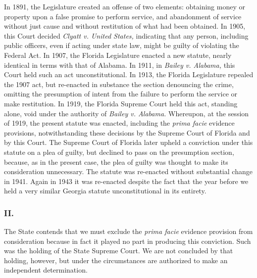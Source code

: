 \documentclass[
  letterpaper,
  11pt,
  DIV=9,
  openright]{scrbook}
\begin{document}
In 1891, the Legislature created an offense of two elements: obtaining
money or property upon a false promise to perform service, and
abandonment of service without just cause and without restitution of
what had been obtained. In 1905, this Court decided \emph{Clyatt v.
United States,} indicating that any person, including public officers,
even if acting under state law, might be guilty of violating the Federal
Act. In 1907, the Florida Legislature enacted a new statute, nearly
identical in terms with that of Alabama. In 1911, in \emph{Bailey v.
Alabama,} this Court held such an act unconstitutional. In 1913, the
Florida Legislature repealed the 1907 act, but re-enacted in substance
the section denouncing the crime, omitting the presumption of intent
from the failure to perform the service or make restitution. In 1919,
the Florida Supreme Court held this act, standing alone, void under the
authority of \emph{Bailey v. Alabama.} Whereupon, at the session of
1919, the present statute was enacted, including the \emph{prima facie}
evidence provisions, notwithstanding these decisions by the Supreme
Court of Florida and by this Court. The Supreme Court of Florida later
upheld a conviction under this statute on a plea of guilty, but declined
to pass on the presumption section, because, as in the present case, the
plea of guilty was thought to make its consideration unnecessary. The
statute was re-enacted without substantial change in 1941. Again in 1943
it was re-enacted despite the fact that the year before we held a very
similar Georgia statute unconstitutional in its entirety.

\subsubsection{II.}\label{ii.}

The State contends that we must exclude the \emph{prima facie} evidence
provision from consideration because in fact it played no part in
producing this conviction. Such was the holding of the State Supreme
Court. We are not concluded by that holding, however, but under the
circumstances are authorized to make an independent determination.
\end{document}
